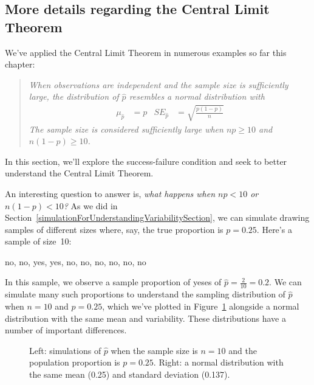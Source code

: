 \subsection{More details regarding the Central Limit Theorem}

\noindent%
We've applied the Central Limit Theorem in numerous examples
so far this chapter:
\begin{quote}{\em
When observations are independent and the sample size is
sufficiently large, the distribution of $\hat{p}$ resembles
a normal distribution with
\begin{align*}
  \mu_{\hat{p}} &= p
  &SE_{\hat{p}} &= \sqrt{\frac{p (1 - p)}{n}}
\end{align*}
The sample size is considered sufficiently large
when $n p \geq 10$ and $n (1 - p) \geq 10$.
}\end{quote}
In this section, we'll explore the success-failure
condition and seek to better understand the
Central Limit Theorem.

An interesting question to answer is, \emph{what happens when
$np < 10$ or $n(1-p) < 10$?} As we did in
Section~\ref{simulationForUnderstandingVariabilitySection},
we can simulate drawing samples of different sizes where,
say, the true proportion is $p = 0.25$.
Here's a sample of size~10:
\begin{center}
no, no, yes, yes, no, no, no, no, no, no
\end{center}
In this sample, we observe a sample proportion of yeses
of $\hat{p} = \frac{2}{10} = 0.2$. We can simulate many such
proportions to understand the sampling distribution of
$\hat{p}$ when $n = 10$ and $p = 0.25$, which we've plotted
in Figure~\ref{sampling_10_prop_25p}
alongside a normal distribution with the
same mean and variability.
These distributions have a number of important differences.

\begin{figure}[h]
   \centering
   \caption{Left: simulations of $\hat{p}$ when the sample size
       is $n = 10$ and the population proportion is $p = 0.25$.
       Right: a normal distribution with the same mean (0.25)
       and standard deviation (0.137).}
   \label{sampling_10_prop_25p}
\end{figure}

